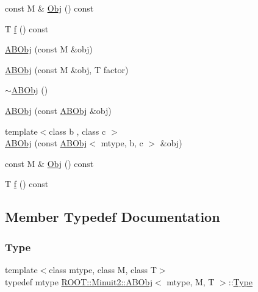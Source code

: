 \begin{DoxyCompactItemize}
const M \& \mbox{\hyperlink{classROOT_1_1Minuit2_1_1ABObj_a82bf2a4359c24b894e4e8990185432c1}{Obj}} () const
\item 
T \mbox{\hyperlink{classROOT_1_1Minuit2_1_1ABObj_aa640f928a8ec245b70d4ac294e1418e5}{f}} () const
\item 
\mbox{\hyperlink{classROOT_1_1Minuit2_1_1ABObj_a48561e673ca2a4a05b9e67af09b1736a}{A\+B\+Obj}} (const M \&obj)
\item 
\mbox{\hyperlink{classROOT_1_1Minuit2_1_1ABObj_a2406012a4e1bd70d0a92c2468eaaee7c}{A\+B\+Obj}} (const M \&obj, T factor)
\item 
\mbox{\hyperlink{classROOT_1_1Minuit2_1_1ABObj_ad6145e561d3c760d83a3481c3933bb98}{$\sim$\+A\+B\+Obj}} ()
\item 
\mbox{\hyperlink{classROOT_1_1Minuit2_1_1ABObj_a2cce5325151c97bcaaec6cb6ecc0cd7b}{A\+B\+Obj}} (const \mbox{\hyperlink{classROOT_1_1Minuit2_1_1ABObj}{A\+B\+Obj}} \&obj)
\item 
{\footnotesize template$<$class b , class c $>$ }\\\mbox{\hyperlink{classROOT_1_1Minuit2_1_1ABObj_af629f9c316122395ab94459e6cf6ed30}{A\+B\+Obj}} (const \mbox{\hyperlink{classROOT_1_1Minuit2_1_1ABObj}{A\+B\+Obj}}$<$ mtype, b, c $>$ \&obj)
\item 
const M \& \mbox{\hyperlink{classROOT_1_1Minuit2_1_1ABObj_a82bf2a4359c24b894e4e8990185432c1}{Obj}} () const
\item 
T \mbox{\hyperlink{classROOT_1_1Minuit2_1_1ABObj_aa640f928a8ec245b70d4ac294e1418e5}{f}} () const
\end{DoxyCompactItemize}


\subsection{Member Typedef Documentation}
\mbox{\label{classROOT_1_1Minuit2_1_1ABObj_aaa1bd50c134682a0713ce549f31e85ab}} 
\subsubsection{\texorpdfstring{Type}{Type}\hspace{0.1cm}{\footnotesize\ttfamily [1/3]}}
{\footnotesize\ttfamily template$<$class mtype, class M, class T$>$ \\
typedef mtype \mbox{\hyperlink{classROOT_1_1Minuit2_1_1ABObj}{R\+O\+O\+T\+::\+Minuit2\+::\+A\+B\+Obj}}$<$ mtype, M, T $>$\+::\mbox{\hyperlink{classROOT_1_1Minuit2_1_1ABObj_aaa1bd50c134682a0713ce549f31e85ab}{Type}}}

